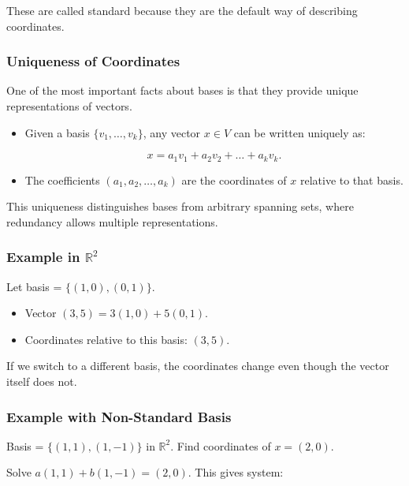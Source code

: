\documentclass[
  letterpaper,
  DIV=11,
  numbers=noendperiod]{scrreprt}
\providecommand{\tightlist}{%
  \setlength{\itemsep}{0pt}\setlength{\parskip}{0pt}}
\begin{document}
These are called standard because they are the default way of describing
coordinates.

\subsubsection{Uniqueness of
Coordinates}\label{uniqueness-of-coordinates}

One of the most important facts about bases is that they provide unique
representations of vectors.

\begin{itemize}
\item
  Given a basis \(\{v_1, \dots, v_k\}\), any vector \(x \in V\) can be
  written uniquely as:

  \[
  x = a_1 v_1 + a_2 v_2 + \dots + a_k v_k.
  \]
\item
  The coefficients \((a_1, a_2, \dots, a_k)\) are the coordinates of
  \(x\) relative to that basis.
\end{itemize}

This uniqueness distinguishes bases from arbitrary spanning sets, where
redundancy allows multiple representations.

\subsubsection{\texorpdfstring{Example in
\(\mathbb{R}^2\)}{Example in \textbackslash mathbb\{R\}\^{}2}}\label{example-in-mathbbr2}

Let basis = \(\{(1,0), (0,1)\}\).

\begin{itemize}
\tightlist
\item
  Vector \((3,5) = 3(1,0) + 5(0,1)\).
\item
  Coordinates relative to this basis: \((3,5)\).
\end{itemize}

If we switch to a different basis, the coordinates change even though
the vector itself does not.

\subsubsection{Example with Non-Standard
Basis}\label{example-with-non-standard-basis}

Basis = \(\{(1,1), (1,-1)\}\) in \(\mathbb{R}^2\). Find coordinates of
\(x = (2,0)\).

Solve \(a(1,1) + b(1,-1) = (2,0)\). This gives system:
\end{document}
